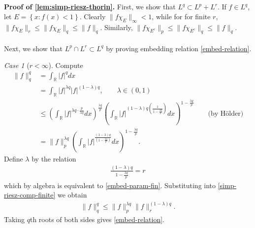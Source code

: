 \documentclass[12pt,reqno]{amsart}
\numberwithin{equation}{section}  %
\numberwithin{figure}{section}
\newcommand{\rr}{\mathbb{R}}
\theoremstyle{plain}
\theoremstyle{definition}
\theoremstyle{remark}
\newtheorem{case}{Case}
\begin{document}
\section{}
{\bf Proof of \autoref{lem:simp-riesz-thorin}.} 
%
First, we show that $L^q \subset L^p + L^r$. If $f \in L^q$, let $E = \left\{ x:
f(x) <1 \right\}$. Clearly $\|f \chi_{E}\|_{\infty} < 1$, while for for finite $r$, $\| f \chi_{E} \|_{r} \le \|f \chi_{E} \|_{q} \le \| f
\|_{q}$. Similarly, $\| f \chi_{E^c} \|_{p} \le \|f \chi_{E^c} \|_{q} \le \|f\|_{q}$. 
\\
\\
Next, we show that $L^{p} \cap L^{r} \subset L^{q}$ by proving embedding relation
\eqref{embed-relation}.
\begin{case}[$r < \infty$]
Compute
%
\begin{equation}
	\label{simp-riesz-comp-finite}
	\begin{split}
		\| f \|_{q}^{q}
		& = \int_{\rr} | f |^{q}dx
		\\
		& = \int_{\rr} | f |^{\lambda q} | f |^{(1-\lambda)q}, \qquad \lambda \in
		(0,1)
		\\
		& \le \left( \int_{\rr} | f |^{\lambda q \cdot \frac{p}{\lambda q}}dx
		\right)^{\frac{\lambda q}{p}}
		\left( \int_{\rr}| f |^{(1- \lambda)q \left(
		\frac{1}{1-\frac{\lambda q}{p}}
		\right)} dx \right)^{1- \frac{\lambda q}{p}} \qquad \text{(by H{\"o}lder)}
		\\
		& =\| f \|_{p}^{\lambda q} \left( \int_{\rr} | f |^{\frac{(1 -
		\lambda)q}{(1 - \frac{\lambda q}{p})}}dx \right)^{1- \frac{\lambda q}{p}}.
	\end{split}
\end{equation}
%
%
Define $\lambda$ by the relation	%
%
\begin{equation*}
	\begin{split}
		\frac{(1 - \lambda)q}{1 - \frac{\lambda q}{p}} = r
	\end{split}
\end{equation*}
%
%
which by algebra is equivalent to \eqref{embed-param-fin}.
%
%
%
%
%
Substituting into \eqref{simp-riesz-comp-finite} we obtain
%
%
\begin{equation*}
	\begin{split}
		\|f\|_{q}^{q} \le \| f \|_{p}^{\lambda q} \| f \|_{r}^{(1 - \lambda)q}.
	\end{split}
\end{equation*}
%
%
Taking $q$th roots of both sides gives \eqref{embed-relation}.
\end{case}	
%
%
\end{document}
